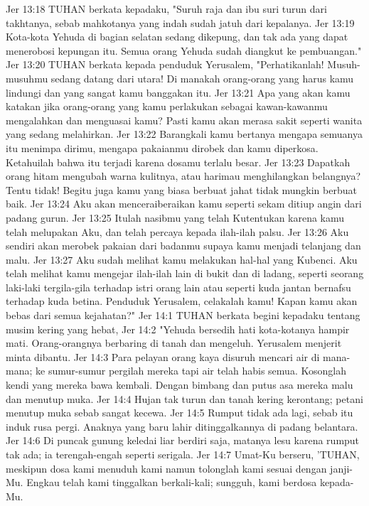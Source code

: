 Jer 13:18  TUHAN berkata kepadaku, "Suruh raja dan ibu suri turun dari takhtanya, sebab mahkotanya yang indah sudah jatuh dari kepalanya.
Jer 13:19  Kota-kota Yehuda di bagian selatan sedang dikepung, dan tak ada yang dapat menerobosi kepungan itu. Semua orang Yehuda sudah diangkut ke pembuangan."
Jer 13:20  TUHAN berkata kepada penduduk Yerusalem, "Perhatikanlah! Musuh-musuhmu sedang datang dari utara! Di manakah orang-orang yang harus kamu lindungi dan yang sangat kamu banggakan itu.
Jer 13:21  Apa yang akan kamu katakan jika orang-orang yang kamu perlakukan sebagai kawan-kawanmu mengalahkan dan menguasai kamu? Pasti kamu akan merasa sakit seperti wanita yang sedang melahirkan.
Jer 13:22  Barangkali kamu bertanya mengapa semuanya itu menimpa dirimu, mengapa pakaianmu dirobek dan kamu diperkosa. Ketahuilah bahwa itu terjadi karena dosamu terlalu besar.
Jer 13:23  Dapatkah orang hitam mengubah warna kulitnya, atau harimau menghilangkan belangnya? Tentu tidak! Begitu juga kamu yang biasa berbuat jahat tidak mungkin berbuat baik.
Jer 13:24  Aku akan menceraiberaikan kamu seperti sekam ditiup angin dari padang gurun.
Jer 13:25  Itulah nasibmu yang telah Kutentukan karena kamu telah melupakan Aku, dan telah percaya kepada ilah-ilah palsu.
Jer 13:26  Aku sendiri akan merobek pakaian dari badanmu supaya kamu menjadi telanjang dan malu.
Jer 13:27  Aku sudah melihat kamu melakukan hal-hal yang Kubenci. Aku telah melihat kamu mengejar ilah-ilah lain di bukit dan di ladang, seperti seorang laki-laki tergila-gila terhadap istri orang lain atau seperti kuda jantan bernafsu terhadap kuda betina. Penduduk Yerusalem, celakalah kamu! Kapan kamu akan bebas dari semua kejahatan?"
Jer 14:1  TUHAN berkata begini kepadaku tentang musim kering yang hebat,
Jer 14:2  "Yehuda bersedih hati kota-kotanya hampir mati. Orang-orangnya berbaring di tanah dan mengeluh. Yerusalem menjerit minta dibantu.
Jer 14:3  Para pelayan orang kaya disuruh mencari air di mana-mana; ke sumur-sumur pergilah mereka tapi air telah habis semua. Kosonglah kendi yang mereka bawa kembali. Dengan bimbang dan putus asa mereka malu dan menutup muka.
Jer 14:4  Hujan tak turun dan tanah kering kerontang; petani menutup muka sebab sangat kecewa.
Jer 14:5  Rumput tidak ada lagi, sebab itu induk rusa pergi. Anaknya yang baru lahir ditinggalkannya di padang belantara.
Jer 14:6  Di puncak gunung keledai liar berdiri saja, matanya lesu karena rumput tak ada; ia terengah-engah seperti serigala.
Jer 14:7  Umat-Ku berseru, 'TUHAN, meskipun dosa kami menuduh kami namun tolonglah kami sesuai dengan janji-Mu. Engkau telah kami tinggalkan berkali-kali; sungguh, kami berdosa kepada-Mu.
